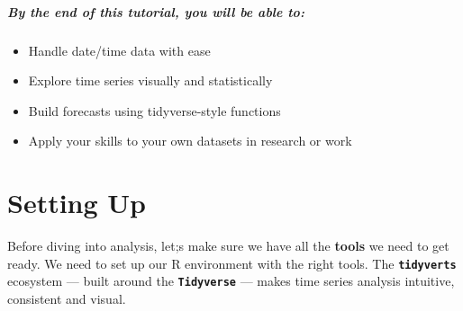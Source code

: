 \documentclass[
  letterpaper,
  DIV=11,
  numbers=noendperiod]{scrreprt}
\providecommand{\tightlist}{%
  \setlength{\itemsep}{0pt}\setlength{\parskip}{0pt}}\usepackage{longtable,booktabs,array}
\begin{document}
\subsubsection{By the end of this tutorial, you will be able
to:}\label{by-the-end-of-this-tutorial-you-will-be-able-to}

\begin{itemize}
\tightlist
\item
  Handle date/time data with ease
\item
  Explore time series visually and statistically
\item
  Build forecasts using tidyverse-style functions
\item
  Apply your skills to your own datasets in research or work
\end{itemize}

\part{Setting Up}

Before diving into analysis, let;s make sure we have all the
\textbf{tools} we need to get ready. We need to set up our R environment
with the right tools. The \textbf{\texttt{tidyverts}} ecosystem ---
built around the \textbf{\texttt{Tidyverse}} --- makes time series
analysis intuitive, consistent and visual.
\end{document}
